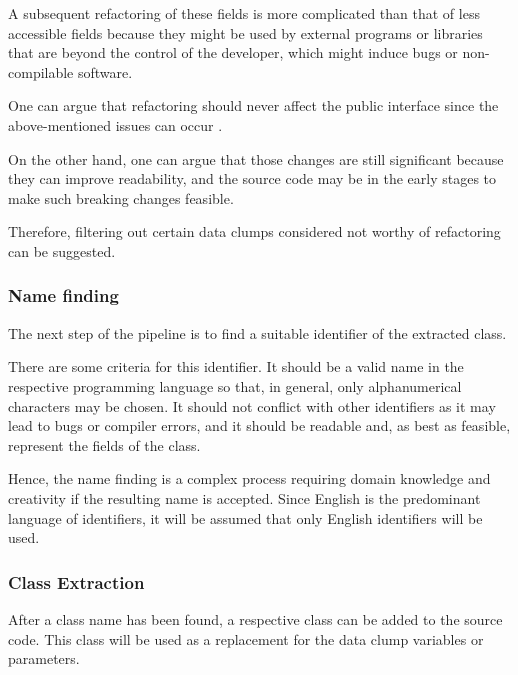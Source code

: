 A subsequent refactoring of these fields is more complicated than that of less accessible fields because they might be used by external programs or libraries that are beyond the control of the developer, which might induce bugs or non-compilable software. 

One can argue that refactoring should never affect the public interface since the above-mentioned issues can occur \cite{10.1145/1352678.1352681}.

On the other hand, one can argue that those changes are still significant because they can improve readability, and the source code may be in the early stages to make such breaking changes feasible. 

Therefore, filtering out certain data clumps considered not worthy of refactoring can be suggested.

\subsubsection{Name finding}\label{subsec:chap3_data_clump_name_finding}
The next step of the pipeline is to find a suitable identifier of the extracted class.

There are some criteria for this identifier. It should be a valid name in the respective programming language so that, in general, only alphanumerical characters may be chosen. It should not conflict with other identifiers as it may lead to bugs or compiler errors, and it should be readable and, as best as feasible, represent the fields of the class.

Hence, the name finding is a complex process requiring domain knowledge and creativity if the resulting name is accepted. 
Since English is the predominant language of identifiers, it will be assumed that only English identifiers will be used. 


\subsubsection{Class Extraction}\label{subsec:chap3_data_class_extraction}
After a class name has been found, a respective class can be added to the source code. This class will be used as a replacement for the data clump variables or parameters. 

